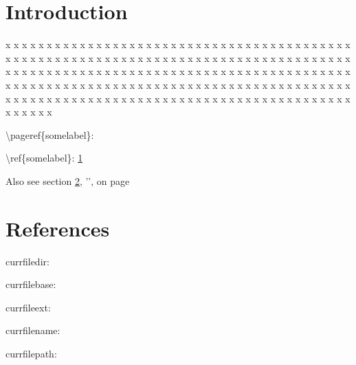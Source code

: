 \documentclass[a5paper]{article}
\begin{document}
\linenumbers

\clearpage\mbox{}\clearpage

% 

\immediate{}





\section{Introduction}
\label{somelabel}
\lipsum[1]


\auxgeo



x x x x x x x x x x x x x x x x x x x x x x x x x x x x x x x x x x x x x x x x x x x x x x x x x x x x x x
x x x x x x x x x x x x x x x x x x x x x x x x x x x x x x x x x x x x x x x x x x x x x x x x x x x x x x
x x x x x x x x x x x x x x x x x x x x x x x x x x x x x x x x x x x x x x x x x x x x x x x x x x x x x x
x x x x x x x x x x x x x x x x x x x x x x x x x x x x x x x x x x x x x x x x x x x x x x x x x x x x x x

\textbackslash{}pageref\{somelabel\}: \pageref{somelabel}

\textbackslash{}ref\{somelabel\}: \ref{somelabel}

Also see section \ref{otherlabel}, '', on page \pageref{otherlabel}

\currfilename

\clearpage
\section{References}
\label{otherlabel}


currfiledir: \currfiledir

currfilebase: \currfilebase

currfileext: \currfileext

currfilename: \currfilename

currfilepath: \currfilepath

\jobname

\end{document}
